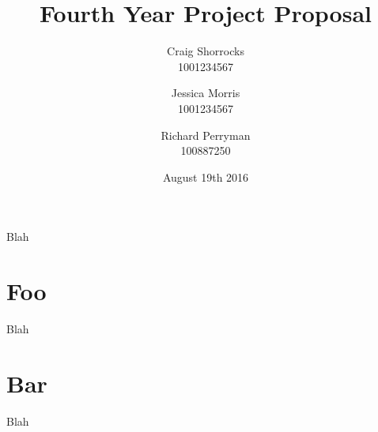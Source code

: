 \documentclass{article}
\title{Fourth Year Project Proposal}
\author{
	Craig Shorrocks \\
	1001234567
	\and
	Jessica Morris \\
	1001234567
	\and
	Richard Perryman\\
	100887250
}
\date{August 19th 2016}
\begin{document}
\maketitle

Blah

\section{Foo}

Blah

\section{Bar}

Blah
\end{document}
